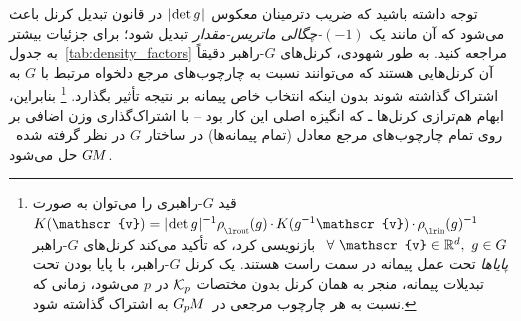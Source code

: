 توجه داشته باشید که ضریب دترمینان معکوس $|\mkern-2mu \det g \mkern1mu|$ در قانون تبدیل کرنل باعث می‌شود که آن مانند یک \emph{$(-1)$-چگالی ماتریس-مقدار} تبدیل شود؛ برای جزئیات بیشتر به جدول~\ref{tab:density_factors} مراجعه کنید.
به طور شهودی، کرنل‌های $G$-راهبر دقیقاً آن کرنل‌هایی هستند که می‌توانند نسبت به چارچوب‌های مرجع دلخواه مرتبط با $G$ به اشتراک گذاشته شوند بدون اینکه انتخاب خاص پیمانه بر نتیجه تأثیر بگذارد.%
\footnote{
	قید $G$-راهبری را می‌توان به صورت
	${K(\mathscr{v}) = \detg^{\minus1} \rhoout(g) \mkern-1mu\cdot\mkern-1.5mu K(g^{\minus1}\mathscr{v}) \mkern-1mu\cdot\mkern-1.5mu \rhoin(g)^{\minus1}}$
	$\mkern8mu \forall\ \mathscr{v} \in \R^d,\ g\in G$
	بازنویسی کرد، که تأکید می‌کند کرنل‌های $G$-راهبر \emph{پایاها} تحت عمل پیمانه در سمت راست هستند.
	یک کرنل $G$-راهبر، با پایا بودن تحت تبدیلات پیمانه، منجر به همان کرنل بدون مختصات $\mathcal{K}_p$ در $p$ می‌شود، زمانی که نسبت به هر چارچوب مرجعی در~$G_{\mkern-1.3mu p}\mkern-1.2muM$ به اشتراک گذاشته شود.
}
بنابراین، ابهام هم‌ترازی کرنل‌ها ـ که انگیزه اصلی این کار بود -- با اشتراک‌گذاری وزن اضافی بر روی تمام چارچوب‌های مرجع معادل (تمام پیمانه‌ها) در ساختار $G$ در نظر گرفته شده~$G\mkern-1.4muM$ حل می‌شود.

